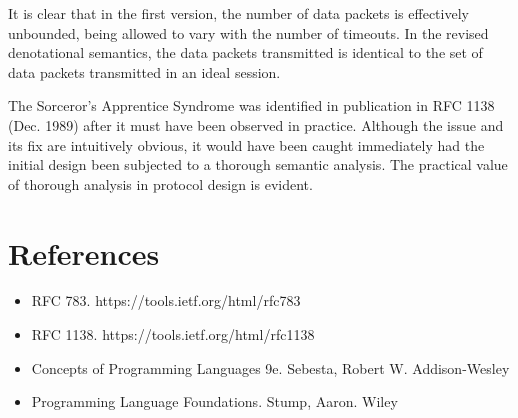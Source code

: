 \documentclass[a0,landscape]{a0poster}
\begin{document}
\begin{multicols}{4}
It is clear that in the first version, the number of data packets is effectively unbounded, being allowed to vary with the number of timeouts. In the revised denotational semantics, the data packets transmitted is identical to the set of data packets transmitted in an ideal session.

The Sorceror's Apprentice Syndrome was identified in publication in RFC 1138 (Dec. 1989) after it must have been observed in practice. Although the issue and its fix are intuitively obvious, it would have been caught immediately had the initial design been subjected to a thorough semantic analysis. The practical value of thorough analysis in protocol design is evident.


\section*{References}

\begin{itemize}
\item{RFC 783.} https://tools.ietf.org/html/rfc783
\item{RFC 1138.} https://tools.ietf.org/html/rfc1138
\item{Concepts of Programming Languages 9e.} Sebesta, Robert W. Addison-Wesley 
\item{Programming Language Foundations.} Stump, Aaron. Wiley 
\end{itemize}


\end{multicols}
\end{document}
